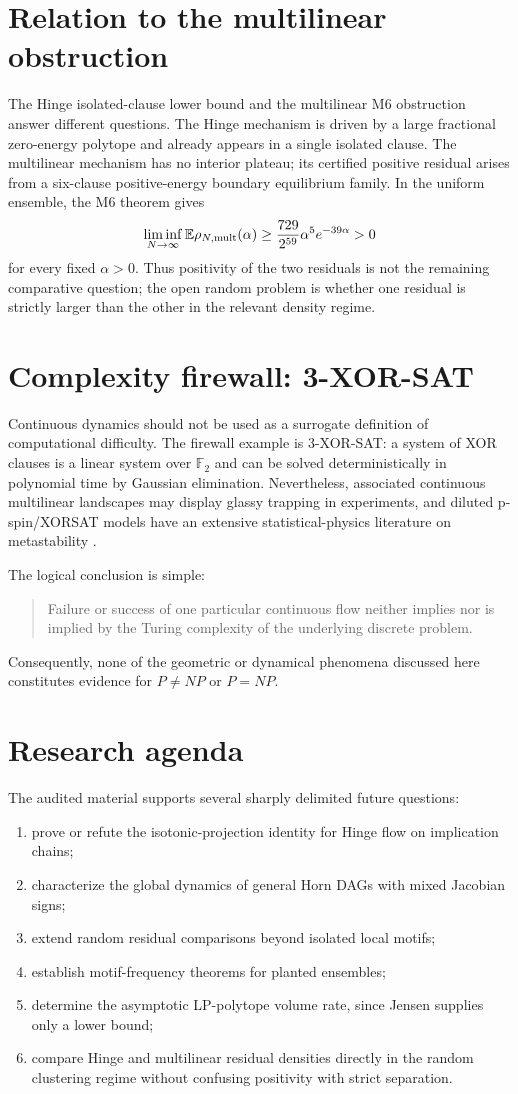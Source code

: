 \documentclass[11pt,a4paper]{article}
\begin{document}
\section{Relation to the multilinear obstruction}
The Hinge isolated-clause lower bound and the multilinear M6 obstruction answer different questions. The Hinge mechanism is driven by a large fractional zero-energy polytope and already appears in a single isolated clause. The multilinear mechanism has no interior plateau; its certified positive residual arises from a six-clause positive-energy boundary equilibrium family. In the uniform ensemble, the M6 theorem gives
\[
\liminf_{N\to\infty}\mathbb E\rho_{N,\rm mult}(\alpha)\ge\frac{729}{2^{59}}\alpha^5e^{-39\alpha}>0
\]
for every fixed $\alpha>0$. Thus positivity of the two residuals is not the remaining comparative question; the open random problem is whether one residual is strictly larger than the other in the relevant density regime.

\section{Complexity firewall: 3-XOR-SAT}
Continuous dynamics should not be used as a surrogate definition of computational difficulty. The firewall example is 3-XOR-SAT: a system of XOR clauses is a linear system over $\mathbb F_2$ and can be solved deterministically in polynomial time by Gaussian elimination. Nevertheless, associated continuous multilinear landscapes may display glassy trapping in experiments, and diluted p-spin/XORSAT models have an extensive statistical-physics literature on metastability \cite{Mezard,Ricci}.

The logical conclusion is simple:
\begin{quote}
Failure or success of one particular continuous flow neither implies nor is implied by the Turing complexity of the underlying discrete problem.
\end{quote}
Consequently, none of the geometric or dynamical phenomena discussed here constitutes evidence for $P\ne NP$ or $P=NP$.

\section{Research agenda}
The audited material supports several sharply delimited future questions:
\begin{enumerate}
\item prove or refute the isotonic-projection identity for Hinge flow on implication chains;
\item characterize the global dynamics of general Horn DAGs with mixed Jacobian signs;
\item extend random residual comparisons beyond isolated local motifs;
\item establish motif-frequency theorems for planted ensembles;
\item determine the asymptotic LP-polytope volume rate, since Jensen supplies only a lower bound;
\item compare Hinge and multilinear residual densities directly in the random clustering regime without confusing positivity with strict separation.
\end{enumerate}
\end{document}
